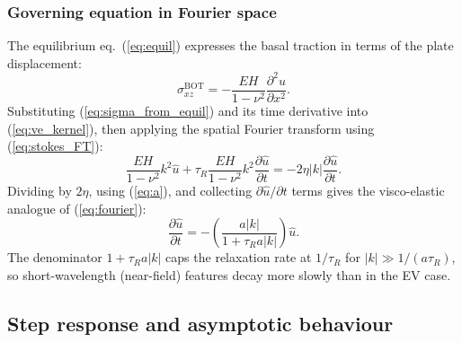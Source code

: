 \documentclass[extra]{gji}
\begin{document}
\subsubsection{Governing equation in Fourier space}

The equilibrium eq.~(\ref{eq:equil}) expresses the basal traction in terms
of the plate displacement:
\begin{equation}
\sigma_{xz}^{\text{BOT}} = -\frac{EH}{1-\nu^2}\frac{\partial^2 u}{\partial x^2}.
\label{eq:sigma_from_equil}
\end{equation}
Substituting (\ref{eq:sigma_from_equil}) and its time derivative into
(\ref{eq:ve_kernel}), then applying the spatial Fourier transform
using (\ref{eq:stokes_FT}):
\begin{equation}
\frac{EH}{1-\nu^2}k^2\hat{u}
+ \tau_R\frac{EH}{1-\nu^2}k^2\frac{\partial\hat{u}}{\partial t}
= -2\eta|k|\frac{\partial\hat{u}}{\partial t}.
\label{eq:maxwell_fourier_pre}
\end{equation}
Dividing by $2\eta$, using (\ref{eq:a}), and collecting
$\partial\hat{u}/\partial t$ terms gives the visco-elastic analogue of
(\ref{eq:fourier}):
\begin{equation}
\frac{\partial\hat{u}}{\partial t}
= -\left(\frac{a|k|}{1+\tau_R a|k|}\right)\hat{u}.
\label{eq:maxwell_fourier}
\end{equation}
The denominator $1+\tau_R a|k|$ caps the relaxation rate at $1/\tau_R$ for
$|k| \gg 1/(a\tau_R)$, so short-wavelength (near-field) features decay more
slowly than in the EV case.

\subsection{Step response and asymptotic behaviour}
\label{sec:eve_step}
\end{document}
